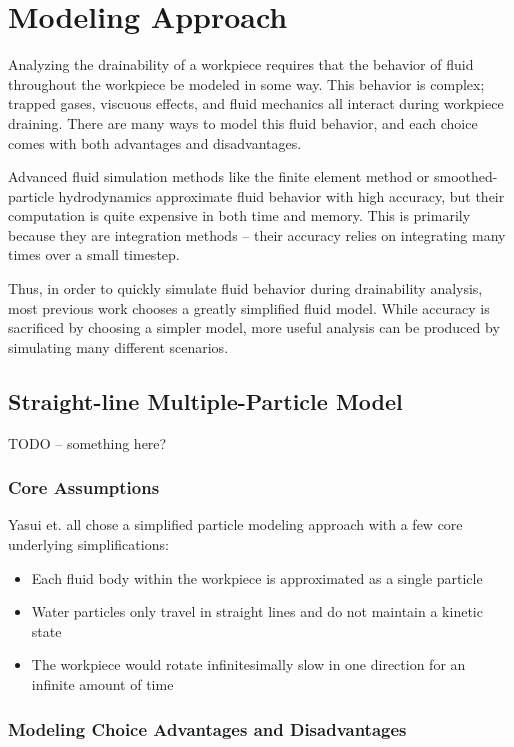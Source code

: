 						\chapter{Modeling Approach}

Analyzing the drainability of a workpiece requires that the behavior of fluid throughout the workpiece be modeled in some way. This behavior is complex; trapped gases, viscuous effects, and fluid mechanics all interact during workpiece draining. There are many ways to model this fluid behavior, and each choice comes with both advantages and disadvantages.

Advanced fluid simulation methods like the finite element method or smoothed-particle hydrodynamics approximate fluid behavior with high accuracy, but their computation is quite expensive in both time and memory. This is primarily because they are integration methods -- their accuracy relies on integrating many times over a small timestep.

Thus, in order to quickly simulate fluid behavior during drainability analysis, most previous work chooses a greatly simplified fluid model. While accuracy is sacrificed by choosing a simpler model, more useful analysis can be produced by simulating many different scenarios.

\section{Straight-line Multiple-Particle Model}

TODO -- something here?

	\subsection{Core Assumptions}

Yasui et. all \cite{plot} chose a simplified particle modeling approach with a few core underlying simplifications:

\begin{itemize}
	\item Each fluid body within the workpiece is approximated as a single particle
	\item Water particles only travel in straight lines and do not maintain a kinetic state
	\item The workpiece would rotate infinitesimally slow in one direction for an infinite amount of time
\end{itemize}

	\subsection{Modeling Choice Advantages and Disadvantages}

